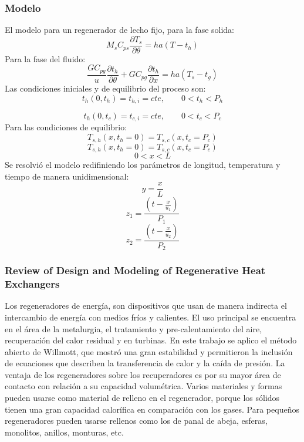 \documentclass[12pt,letterpaper,final]{article}%
\begin{document}
\subsubsection*{Modelo}
El modelo para un regenerador de lecho fijo, para la fase solida:
\begin{equation}
	M_s C_{ps}\frac{\partial T_s}{\partial \theta} = h a (T - t_h)
\end{equation}
Para la fase del fluido:
\begin{equation}
	\frac{G C_{pg}}{u}\frac{\partial t_h}{\partial \theta} + G C_{pg}\frac{\partial t_h}{\partial x} = ha(T_s - t_g)
\end{equation}
Las condiciones iniciales y de equilibrio del proceso son:
\begin{equation*}
	t_h(0,t_h) = t_{h,i} = cte , \qquad 0<t_h<P_h
\end{equation*}

\begin{equation*}
	t_h(0,t_c) = t_{c,i} = cte , \qquad 0<t_c<P_c
\end{equation*}
Para las condiciones de equilibrio:
\begin{equation*}
	T_{s,h}(x,t_h=0) = T_{s,c}(x,t_c=P_c)
\end{equation*}
\begin{equation*}
	T_{s,h}(x,t_h=0) = T_{s,c}(x,t_c=P_c)
\end{equation*}
\begin{equation*}
	0<x<L
\end{equation*}
Se resolvió el modelo redifiniendo los parámetros de longitud, temperatura y tiempo de manera unidimensional:
\begin{equation*}
	y = \frac{x}{L}
\end{equation*}
\begin{equation*}
	z_1 = \frac{(t-\frac{x}{u_1})}{P_1}
\end{equation*}
\begin{equation*}
	z_2 = \frac{(t-\frac{x}{u_2})}{P_2}
\end{equation*}
\subsubsection*{Review of Design and Modeling of Regenerative
	Heat Exchangers}
	Los regeneradores de energía, son dispositivos que usan de manera indirecta el intercambio de energía con medios fríos y calientes. El uso principal se encuentra en el área de la metalurgia, el tratamiento y pre-calentamiento del aire, recuperación del calor residual y en turbinas. En este trabajo se aplico el método abierto de Willmott, que mostró una gran estabilidad y permitieron la inclusión de ecuaciones que describen la transferencia de calor y la caída de presión. La ventaja de los regeneradores sobre los recuperadores es por su mayor área de contacto con relación a su capacidad volumétrica. Varios materiales y formas pueden usarse como material de relleno en el regenerador, porque los sólidos tienen una gran capacidad calorífica en comparación con los gases. Para pequeños regeneradores pueden usarse rellenos como los de panal de abeja, esferas, monolitos, anillos, monturas, etc.  \cite{Kilkovsky2020}
\end{document}
